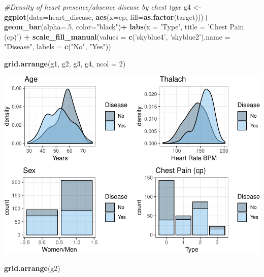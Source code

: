 \documentclass[]{article}
\newenvironment{Shaded}{\begin{snugshade}}{\end{snugshade}}
\newcommand{\KeywordTok}[1]{\textcolor[rgb]{0.13,0.29,0.53}{\textbf{#1}}}
\newcommand{\DataTypeTok}[1]{\textcolor[rgb]{0.13,0.29,0.53}{#1}}
\newcommand{\DecValTok}[1]{\textcolor[rgb]{0.00,0.00,0.81}{#1}}
\newcommand{\StringTok}[1]{\textcolor[rgb]{0.31,0.60,0.02}{#1}}
\newcommand{\CommentTok}[1]{\textcolor[rgb]{0.56,0.35,0.01}{\textit{#1}}}
\newcommand{\OperatorTok}[1]{\textcolor[rgb]{0.81,0.36,0.00}{\textbf{#1}}}
\newcommand{\NormalTok}[1]{#1}
\begin{document}
\begin{Shaded}
\begin{Highlighting}[]
\CommentTok{#Density of heart presence/absence disease by chest type}
\NormalTok{g4 <-}\StringTok{ }\KeywordTok{ggplot}\NormalTok{(}\DataTypeTok{data=}\NormalTok{heart_disease, }\KeywordTok{aes}\NormalTok{(}\DataTypeTok{x=}\NormalTok{cp, }\DataTypeTok{fill=}\KeywordTok{as.factor}\NormalTok{(target)))}\OperatorTok{+}
\StringTok{  }\KeywordTok{geom_bar}\NormalTok{(}\DataTypeTok{alpha=}\NormalTok{.}\DecValTok{5}\NormalTok{, }\DataTypeTok{color=}\StringTok{"black"}\NormalTok{)}\OperatorTok{+}
\StringTok{  }\KeywordTok{labs}\NormalTok{(}\DataTypeTok{x =} \StringTok{'Type'}\NormalTok{, }\DataTypeTok{title =} \StringTok{'Chest Pain (cp)'}\NormalTok{) }\OperatorTok{+}
\StringTok{  }\KeywordTok{scale_fill_manual}\NormalTok{(}\DataTypeTok{values =} \KeywordTok{c}\NormalTok{(}\StringTok{'skyblue4'}\NormalTok{, }\StringTok{'skyblue2'}\NormalTok{),}\DataTypeTok{name =} \StringTok{"Disease"}\NormalTok{, }\DataTypeTok{labels =} \KeywordTok{c}\NormalTok{(}\StringTok{"No"}\NormalTok{, }\StringTok{"Yes"}\NormalTok{))}

\KeywordTok{grid.arrange}\NormalTok{(g1, g2, g3, g4, }\DataTypeTok{ncol =} \DecValTok{2}\NormalTok{)}
\end{Highlighting}
\end{Shaded}

\includegraphics{project_report_files/figure-latex/unnamed-chunk-6-1.pdf}

\begin{Shaded}
\begin{Highlighting}[]
\KeywordTok{grid.arrange}\NormalTok{(g2)}
\end{Highlighting}
\end{Shaded}
\end{document}
